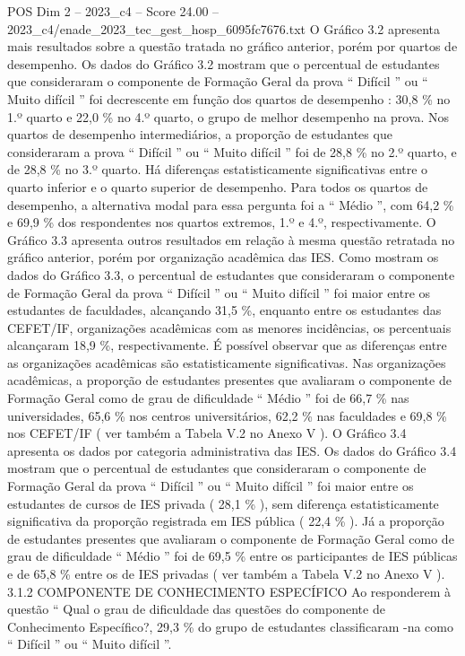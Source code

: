 \begin{textsample}{POS Dim 2 – 2023\_c4 – Score 24.00 – 2023\_c4/enade\_2023\_tec\_gest\_hosp\_6095fc7676.txt}
O Gráfico 3.2 apresenta mais resultados sobre a questão tratada no gráfico anterior, porém por quartos de desempenho.
Os dados do Gráfico 3.2 mostram que o percentual de estudantes que consideraram o componente de Formação Geral da prova “ Difícil ” ou “ Muito difícil ” foi decrescente em função dos quartos de desempenho : 30,8 \% no 1.º quarto e 22,0 \% no 4.º quarto, o grupo de melhor desempenho na prova.
Nos quartos de desempenho intermediários, a proporção de estudantes que consideraram a prova “ Difícil ” ou “ Muito difícil ” foi de 28,8 \% no 2.º quarto, e de 28,8 \% no 3.º quarto.
Há diferenças estatisticamente significativas entre o quarto inferior e o quarto superior de desempenho.
Para todos os quartos de desempenho, a alternativa modal para essa pergunta foi a “ Médio ”, com 64,2 \% e 69,9 \% dos respondentes nos quartos extremos, 1.º e 4.º, respectivamente.
O Gráfico 3.3 apresenta outros resultados em relação à mesma questão retratada no gráfico anterior, porém por organização acadêmica das IES.
Como mostram os dados do Gráfico 3.3, o percentual de estudantes que consideraram o componente de Formação Geral da prova “ Difícil ” ou “ Muito difícil ” foi maior entre os estudantes de faculdades, alcançando 31,5 \%, enquanto entre os estudantes das CEFET/IF, organizações acadêmicas com as menores incidências, os percentuais alcançaram 18,9 \%, respectivamente.
É possível observar que as diferenças entre as organizações acadêmicas são estatisticamente significativas.
Nas organizações acadêmicas, a proporção de estudantes presentes que avaliaram o componente de Formação Geral como de grau de dificuldade “ Médio ” foi de 66,7 \% nas universidades, 65,6 \% nos centros universitários, 62,2 \% nas faculdades e 69,8 \% nos CEFET/IF ( ver também a Tabela V.2 no Anexo V ).
O Gráfico 3.4 apresenta os dados por categoria administrativa das IES.
Os dados do Gráfico 3.4 mostram que o percentual de estudantes que consideraram o componente de Formação Geral da prova “ Difícil ” ou “ Muito difícil ” foi maior entre os estudantes de cursos de IES privada ( 28,1 \% ), sem diferença estatisticamente significativa da proporção registrada em IES pública ( 22,4 \% ).
Já a proporção de estudantes presentes que avaliaram o componente de Formação Geral como de grau de dificuldade “ Médio ” foi de 69,5 \% entre os participantes de IES públicas e de 65,8 \% entre os de IES privadas ( ver também a Tabela V.2 no Anexo V ). 3.1.2 COMPONENTE DE CONHECIMENTO ESPECÍFICO Ao responderem à questão “ Qual o grau de dificuldade das questões do componente de Conhecimento Específico?, 29,3 \% do grupo de estudantes classificaram -na como “ Difícil ” ou “ Muito difícil ”.

\end{textsample}
